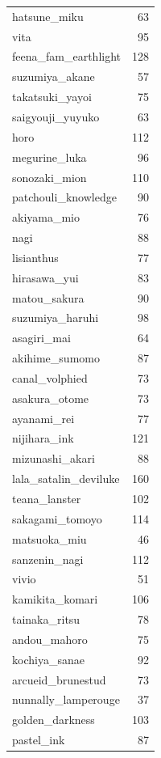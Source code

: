 \documentclass[11.5pt]{article}
\begin{document}
\begin{supertabular}[h!]{lr}
        hatsune\_miku & 63 \\
        vita & 95 \\
        feena\_fam\_earthlight & 128 \\
        suzumiya\_akane & 57 \\
        takatsuki\_yayoi & 75 \\
        saigyouji\_yuyuko & 63 \\
        horo & 112 \\
        megurine\_luka & 96 \\
        sonozaki\_mion & 110 \\
        patchouli\_knowledge & 90 \\
        akiyama\_mio & 76 \\
        nagi & 88 \\
        lisianthus & 77 \\
        hirasawa\_yui & 83 \\
        matou\_sakura & 90 \\
        suzumiya\_haruhi & 98 \\
        asagiri\_mai & 64 \\
        akihime\_sumomo & 87 \\
        canal\_volphied & 73 \\
        asakura\_otome & 73 \\
        ayanami\_rei & 77 \\
        nijihara\_ink & 121 \\
        mizunashi\_akari & 88 \\
        lala\_satalin\_deviluke & 160 \\
        teana\_lanster & 102 \\
        sakagami\_tomoyo & 114 \\
        matsuoka\_miu & 46 \\
        sanzenin\_nagi & 112 \\
        vivio & 51 \\
        kamikita\_komari & 106 \\
        tainaka\_ritsu & 78 \\
        andou\_mahoro & 75 \\
        kochiya\_sanae & 92 \\
        arcueid\_brunestud & 73 \\
        nunnally\_lamperouge & 37 \\
        golden\_darkness & 103 \\
        pastel\_ink & 87 \\

\end{supertabular}
\end{document}
